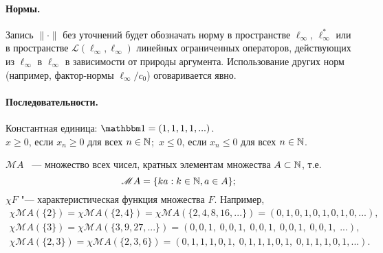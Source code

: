 \paragraph{Нормы.}
Запись $\|\cdot\|$ без уточнений будет обозначать норму в пространстве $\ell_\infty$, $\ell_\infty^*$
или в пространстве  $\mathcal L (\ell_\infty, \ell_\infty)$ линейных ограниченных операторов, действующих из $\ell_\infty$ в $\ell_\infty$ в зависимости от природы аргумента.
Использование других норм (например, фактор-нормы $\ell_\infty / c_0$)
оговаривается явно.


\paragraph{Последовательности.} Константная единица: $\one = (1, 1, 1, 1, ...)$.
%
\\
$x\geq 0$, если $x_n \geq 0$ для всех $n\in \mathbb{N}$;\hfill~$x\leq 0$, если $x_n \leq 0$ для всех $n\in \mathbb{N}$.

$\mathscr{M}A$ ~--- множество всех чисел,
кратных элементам множества $A\subset\mathbb{N}$, т.е.
\begin{equation}
	\mathscr{M}A = \{ka: k\in\mathbb{N}, a\in A\}
	;
\end{equation}
$\chi F$ "--- характеристическая функция множества $F$.
Например,
\begin{gather}
	\chi \mathscr{M}\!A(\{2\}) = \chi \mathscr{M}\!A(\{2, 4\}) = \chi \mathscr{M}\!A(\{2,4,8,16,...\})
	= (0,1,0,1,0,1,0,1,0,...),
\\
	\chi \mathscr{M}\!A(\{3\}) = \chi \mathscr{M}\!A(\{3,9,27,...\}) = (0,0,1,\;0,0,1,\;0,0,1,\;0,0,1,\;0,0,1,\;...),
\\
	\chi \mathscr{M}\!A(\{2,3\}) = \chi \mathscr{M}\!A(\{2,3,6\}) = (0,1,1,1,0,1,\;0,1,1,1,0,1,\;0,1,1,1,0,1,...).
\end{gather}


